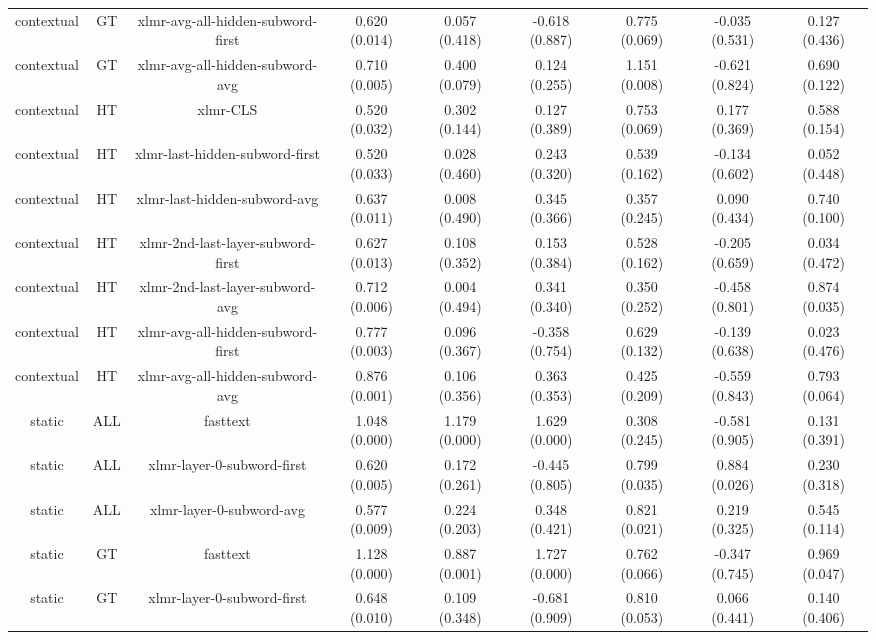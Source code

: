 \begin{sidewaystable}[htb]
\begin{tabular}{@{}ccccccccc@{}}
        contextual & GT & xlmr-avg-all-hidden-subword-first & 0.620 (0.014) & 0.057 (0.418) & -0.618 (0.887) & 0.775 (0.069) & -0.035 (0.531) & 0.127 (0.436) \\
        contextual & GT & xlmr-avg-all-hidden-subword-avg & 0.710 (0.005) & 0.400 (0.079) & 0.124 (0.255) & 1.151 (0.008) & -0.621 (0.824) & 0.690 (0.122) \\
        contextual & HT & xlmr-CLS & 0.520 (0.032) & 0.302 (0.144) & 0.127 (0.389) & 0.753 (0.069) & 0.177 (0.369) & 0.588 (0.154) \\
        contextual & HT & xlmr-last-hidden-subword-first & 0.520 (0.033) & 0.028 (0.460) & 0.243 (0.320) & 0.539 (0.162) & -0.134 (0.602) & 0.052 (0.448) \\
        contextual & HT & xlmr-last-hidden-subword-avg & 0.637 (0.011) & 0.008 (0.490) & 0.345 (0.366) & 0.357 (0.245) & 0.090 (0.434) & 0.740 (0.100) \\
        contextual & HT & xlmr-2nd-last-layer-subword-first & 0.627 (0.013) & 0.108 (0.352) & 0.153 (0.384) & 0.528 (0.162) & -0.205 (0.659) & 0.034 (0.472) \\
        contextual & HT & xlmr-2nd-last-layer-subword-avg & 0.712 (0.006) & 0.004 (0.494) & 0.341 (0.340) & 0.350 (0.252) & -0.458 (0.801) & 0.874 (0.035) \\
        contextual & HT & xlmr-avg-all-hidden-subword-first & 0.777 (0.003) & 0.096 (0.367) & -0.358 (0.754) & 0.629 (0.132) & -0.139 (0.638) & 0.023 (0.476) \\
        contextual & HT & xlmr-avg-all-hidden-subword-avg & 0.876 (0.001) & 0.106 (0.356) & 0.363 (0.353) & 0.425 (0.209) & -0.559 (0.843) & 0.793 (0.064) \\
        static & ALL & fasttext & 1.048 (0.000) & 1.179 (0.000) & 1.629 (0.000) & 0.308 (0.245) & -0.581 (0.905) & 0.131 (0.391) \\
        static & ALL & xlmr-layer-0-subword-first & 0.620 (0.005) & 0.172 (0.261) & -0.445 (0.805) & 0.799 (0.035) & 0.884 (0.026) & 0.230 (0.318) \\
        static & ALL & xlmr-layer-0-subword-avg & 0.577 (0.009) & 0.224 (0.203) & 0.348 (0.421) & 0.821 (0.021) & 0.219 (0.325) & 0.545 (0.114) \\
        static & GT & fasttext & 1.128 (0.000) & 0.887 (0.001) & 1.727 (0.000) & 0.762 (0.066) & -0.347 (0.745) & 0.969 (0.047) \\
        static & GT & xlmr-layer-0-subword-first & 0.648 (0.010) & 0.109 (0.348) & -0.681 (0.909) & 0.810 (0.053) & 0.066 (0.441) & 0.140 (0.406) \\

\end{tabular}
\end{sidewaystable}
